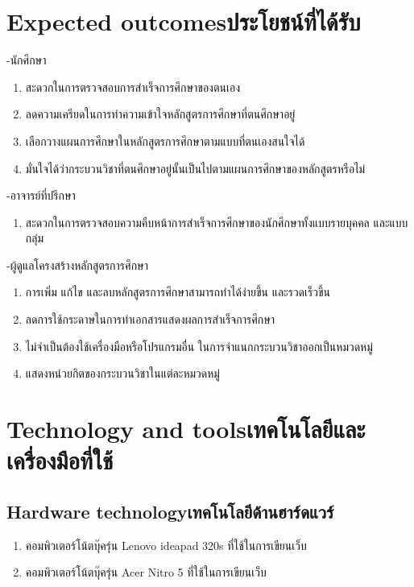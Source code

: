 \section{\ifenglish Expected outcomes\else ประโยชน์ที่ได้รับ\fi}
-นักศึกษา 

\begin{enumerate}
    \item สะดวกในการตรวจสอบการสำเร็จการศึกษาของตนเอง 
    \item ลดความเครียดในการทำความเข้าใจหลักสูตรการศึกษาที่ตนศึกษาอยู่ 
    \item เลือกวางแผนการศึกษาในหลักสูตรการศึกษาตามแบบที่ตนเองสนใจได้
    \item มั่นใจได้ว่ากระบวนวิชาที่ตนศึกษาอยู่นั้นเป็นไปตามแผนการศึกษาของหลักสูตรหรือไม่ 
    
\end{enumerate}

-อาจารย์ที่ปรึกษา 

\begin{enumerate}
    \item สะดวกในการตรวจสอบความคืบหน้าการสำเร็จการศึกษาของนักศึกษาทั้งแบบรายบุคคล และแบบกลุ่ม 
\end{enumerate}

-ผู้ดูแลโครงสร้างหลักสูตรการศึกษา

\begin{enumerate}
    \item การเพิ่ม แก้ไข และลบหลักสูตรการศึกษาสามารถทำได้ง่ายขึ้น  และรวดเร็วขึ้น
    \item ลดการใช้กระดาษในการทำเอกสารแสดงผลการสำเร็จการศึกษา 
    \item ไม่จำเป็นต้องใช้เครื่องมือหรือโปรแกรมอื่น ในการจำแนกกระบวนวิชาออกเป็นหมวดหมู่ 
    \item แสดงหน่วยกิตของกระบวนวิชาในแต่ละหมวดหมู่
    
\end{enumerate}

\section{\ifenglish Technology and tools\else เทคโนโลยีและเครื่องมือที่ใช้\fi}

\subsection{\ifenglish Hardware technology\else เทคโนโลยีด้านฮาร์ดแวร์\fi}

\begin{enumerate}
    \item คอมพิวเตอร์โน้ตบุ๊ครุ่น Lenovo ideapad 320s ที่ใช้ในการเขียนเว็บ
    \item คอมพิวเตอร์โน้ตบุ๊ครุ่น Acer Nitro 5  ที่ใช้ในการเขียนเว็บ
\end{enumerate}

